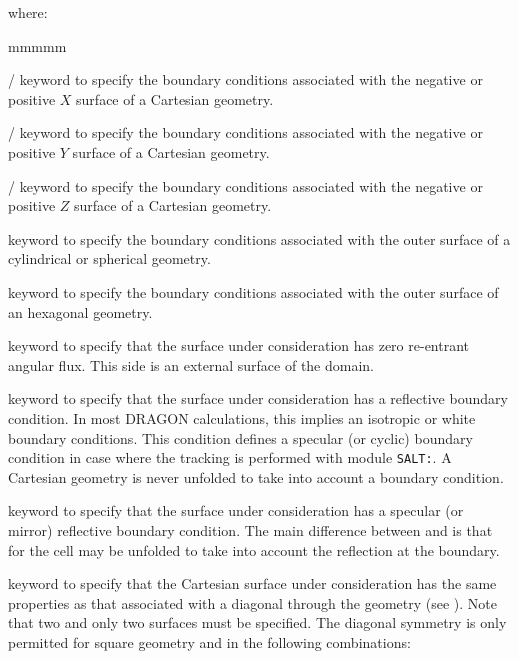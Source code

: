 \noindent
where: 

\begin{ListeDeDescription}{mmmmm}

\item[\moc{X-}/\moc{X+}] keyword to specify the boundary conditions associated with the
negative or positive $X$ surface of a Cartesian geometry.

\item[\moc{Y-}/\moc{Y+}] keyword to specify the boundary conditions associated with the
negative or positive $Y$ surface of a Cartesian geometry.

\item[\moc{Z-}/\moc{Z+}] keyword to specify the boundary conditions associated with the
negative or positive $Z$ surface of a Cartesian geometry.          

\item[\moc{R+}] keyword to specify the boundary conditions associated with the
outer surface of a cylindrical or spherical geometry.

\item[\moc{HBC}] keyword to specify the boundary conditions associated with
the outer surface of an hexagonal geometry.

\item[\moc{VOID}] keyword to specify that the surface under consideration has
zero re-entrant angular flux. This side is an external surface of the domain.

\item[\moc{REFL}] keyword to specify that the surface under consideration has a reflective boundary condition. In 
most DRAGON calculations, this implies an isotropic or white boundary conditions. This condition defines a specular (or cyclic)
boundary condition in case where the tracking is performed with module {\tt SALT:}. A Cartesian geometry is never
unfolded to take into account a  boundary condition.

\item[\moc{SSYM}] keyword to specify that the surface under consideration has a specular (or mirror) reflective boundary condition. The 
main difference between  and  is that for  the cell may be unfolded to take 
into account the reflection at the boundary.

\item[\moc{DIAG}] keyword to specify that the Cartesian surface under
consideration has the same properties as that associated with a diagonal through
the geometry (see ). Note that two and only two  surfaces must be specified.
The diagonal symmetry is only permitted for square geometry and in the following
combinations:  


\end{ListeDeDescription}
